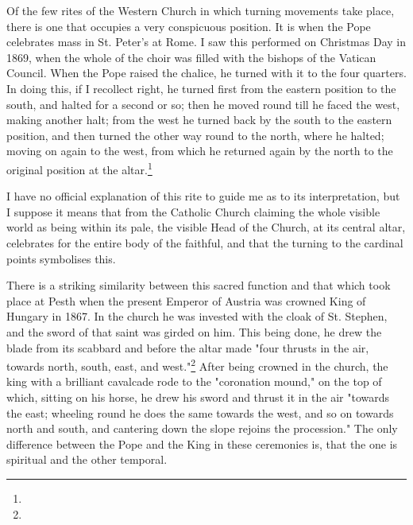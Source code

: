 \documentclass[a4paper, 11pt, oneside, polutonikogreek, english]{article}
\begin{document}
Of the few rites of the Western Church in which turning movements take place, there is one that occupies a very conspicuous position. It is when the Pope celebrates mass in St. Peter's at Rome. I saw this performed on Christmas Day in 1869, when the whole of the choir was filled with the bishops of the Vatican Council. When the Pope raised the chalice, he turned with it to the four quarters. In doing this, if I recollect right, he turned first from the eastern position to the south, and halted for a second or so; then he moved round till he faced the west, making another halt; from the west he turned back by the south to the eastern position, and then turned the other way round to the north, where he halted; moving on again to the west, from which he returned again by the north to the original position at the altar.\footnote{}

I have no official explanation of this rite to guide me as to its interpretation, but I suppose it means that from the Catholic Church claiming the whole visible world as being within its pale, the visible Head of the Church, at its central altar, celebrates for the entire body of the faithful, and that the turning to the cardinal points symbolises this.

There is a striking similarity between this sacred function and that which took place at Pesth when the present Emperor of Austria was crowned King of Hungary in 1867. In the church he was invested with the cloak of St. Stephen, and the sword of that saint was girded on him. This being done, he drew the blade from its scabbard and before the altar made "four thrusts in the air, towards north, south, east, and west."\footnote{} After being crowned in the church, the king with a brilliant cavalcade rode to the "coronation mound," on the top of which, sitting on his horse, he drew his sword and thrust it in the air "towards the east; wheeling round he does the same towards the west, and so on towards north and south, and cantering down the slope rejoins the procession." The only difference between the Pope and the King in these ceremonies is, that the one is spiritual and the other temporal.
\end{document}
